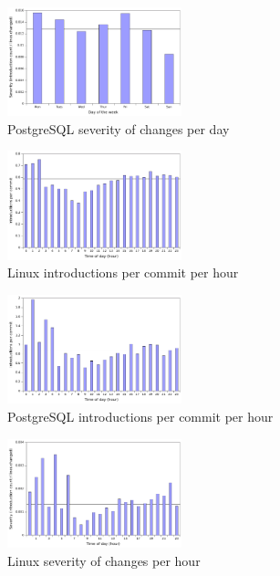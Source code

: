 \begin{figure}
\begin{center}
\includegraphics[width=0.45\textwidth]{postgresql-severity-day.pdf}
\end{center}
\caption{PostgreSQL severity of changes per day}
\label{fig-postgresql-severity-day}
\end{figure}

\begin{figure}
\begin{center}
\includegraphics[width=0.45\textwidth]{linux-introductions-hour.pdf}
\end{center}
\caption{Linux introductions per commit per hour}
\label{fig-linux-introductions-hour}
\end{figure}

\begin{figure}
\begin{center}
\includegraphics[width=0.45\textwidth]{postgresql-introductions-hour.pdf}
\end{center}
\caption{PostgreSQL introductions per commit per hour}
\label{fig-postgresql-introductions-hour}
\end{figure}

\begin{figure}
\begin{center}
\includegraphics[width=0.45\textwidth]{linux-severity-hour.pdf}
\end{center}
\caption{Linux severity of changes per hour}
\label{fig-linux-severity-hour}
\end{figure}

